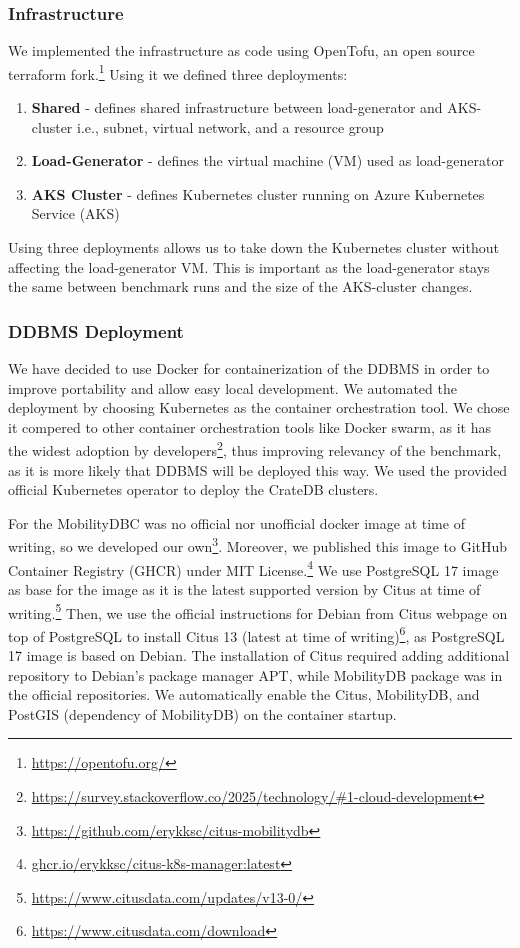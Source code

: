 \subsubsection{Infrastructure}
We implemented the infrastructure as code using OpenTofu, an open source terraform fork.\footnote{\url{https://opentofu.org/}}
Using it we defined three deployments:
\begin{enumerate}
	\item \textbf{Shared} - defines shared infrastructure between load-generator and AKS-cluster i.e., subnet, virtual network, and a resource group
	\item \textbf{Load-Generator} - defines the virtual machine (VM) used as load-generator
	\item \textbf{AKS Cluster} - defines Kubernetes cluster running on Azure Kubernetes Service (AKS)
\end{enumerate}

Using three deployments allows us to take down the Kubernetes cluster without affecting the load-generator VM.
This is important as the load-generator stays the same between benchmark runs and the size of the AKS-cluster changes.

\subsubsection{DDBMS Deployment}

We have decided to use Docker for containerization of the DDBMS in order to improve portability and allow easy local development.
We automated the deployment by choosing Kubernetes as the container orchestration tool.
We chose it compered to other container orchestration tools like Docker swarm, as it has the widest adoption by developers\footnote{\url{https://survey.stackoverflow.co/2025/technology/\#1-cloud-development}}, thus improving relevancy of the benchmark, as it is more likely that DDBMS will be deployed this way. We used the provided official Kubernetes operator to deploy the CrateDB clusters.

For the MobilityDBC was no official nor unofficial docker image at time of writing, so we developed our own\footnote{\url{https://github.com/erykksc/citus-mobilitydb}}.
Moreover, we published this image to GitHub Container Registry (GHCR) under MIT License.\footnote{\url{ghcr.io/erykksc/citus-k8s-manager:latest}}
We use PostgreSQL 17 image as base for the image as it is the latest supported version by Citus at time of writing.\footnote{\url{https://www.citusdata.com/updates/v13-0/}}
Then, we use the official instructions for Debian from Citus webpage on top of PostgreSQL to install Citus 13 (latest at time of writing)\footnote{\url{https://www.citusdata.com/download}}, as PostgreSQL 17 image is based on Debian.
The installation of Citus required adding additional repository to Debian's package manager APT, while MobilityDB package was in the official repositories.
We automatically enable the Citus, MobilityDB, and PostGIS (dependency of MobilityDB) on the container startup.


